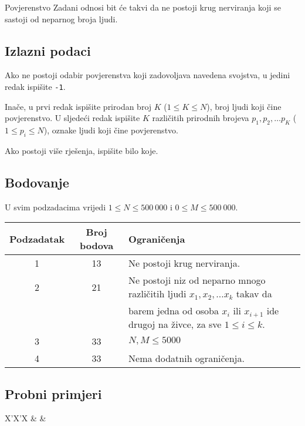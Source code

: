 \begin{statement}[
  problempoints=100,
  timelimit=3 sekunde,
  memorylimit=512 MiB,
]{Povjerenstvo}
Zadani odnosi bit će takvi da ne postoji krug nerviranja koji se sastoji od
neparnog broja ljudi.

\subsection*{Izlazni podaci}

Ako ne postoji odabir povjerenstva koji zadovoljava navedena svojstva, u jedini
redak ispišite \texttt{-1}.

Inače, u prvi redak ispišite prirodan broj $K$ ($1 \leq K \leq N$), broj ljudi
koji čine povjerenstvo. U sljedeći redak ispišite $K$ različitih prirodnih
brojeva $p_1, p_2, \dots p_K$ ($1 \leq p_i \leq N$), oznake ljudi koji čine
povjerenstvo.

Ako postoji više rješenja, ispišite bilo koje.

\subsection*{Bodovanje}

U svim podzadacima vrijedi $1 \leq N \leq 500~000$ i $0 \leq M \leq 500~000$.

{\renewcommand{\arraystretch}{1.4}
  \setlength{\tabcolsep}{6pt}
  \begin{tabular}{ccl}
   Podzadatak & Broj bodova & Ograničenja \\ \midrule
    1 & 13 & Ne postoji krug nerviranja. \\
    2 & 21 & Ne postoji niz od neparno mnogo različitih ljudi $x_1, x_2, \dots x_k$ takav da \\
      &    & barem jedna od osoba $x_i$ ili $x_{i+1}$ ide drugoj na živce, za sve $1 \leq i \leq k$. \\
    3 & 33 & $N, M \leq 5000$ \\
    4 & 33 & Nema dodatnih ograničenja.
\end{tabular}}

\subsection*{Probni primjeri}
\begin{tabularx}{\textwidth}{X'X'X}
 &
 &
\end{tabularx}


\end{statement}
